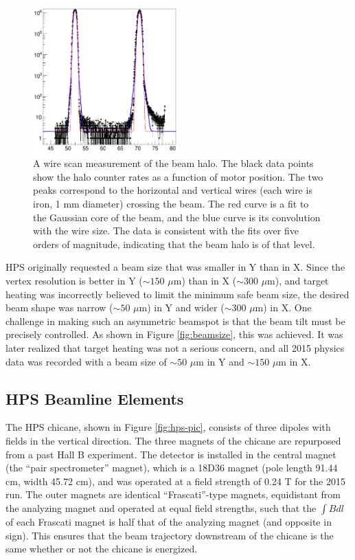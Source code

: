 \begin{figure}[htp]
    \begin{center}
        \includegraphics[width=0.5\textwidth]{detector/figs/beam-tails}
    \end{center}
    \caption{A wire scan measurement of the beam halo.
    The black data points show the halo counter rates as a function of motor position.
    The two peaks correspond to the horizontal and vertical wires (each wire is iron, 1 mm diameter) crossing the beam.
    The red curve is a fit to the Gaussian core of the beam, and the blue curve is its convolution with the wire size.
    The data is consistent with the fits over five orders of magnitude, indicating that the beam halo is of that level.
    }
    \label{fig:beam-tails}
\end{figure}

HPS originally requested a beam size that was smaller in Y than in X.
Since the vertex resolution is better in Y ($\sim 150$ $\mu$m) than in X ($\sim 300$ $\mu$m), and target heating was incorrectly believed to limit the minimum safe beam size, the desired beam shape was narrow ($\sim 50$ $\mu$m) in Y and wider ($\sim 300$ $\mu$m) in X.
One challenge in making such an asymmetric beamspot is that the beam tilt must be precisely controlled.
As shown in Figure \ref{fig:beamsize}, this was achieved.
It was later realized that target heating was not a serious concern, and all 2015 physics data was recorded with a beam size of $\sim 50$ $\mu$m in Y and $\sim 150$ $\mu$m in X.

\subsection{HPS Beamline Elements}

The HPS chicane, shown in Figure \ref{fig:hps-pic}, consists of three dipoles with fields in the vertical direction.
The three magnets of the chicane are repurposed from a past Hall B experiment.
The detector is installed in the central magnet (the ``pair spectrometer'' magnet), which is a 18D36 magnet (pole length 91.44 cm, width 45.72 cm), and was operated at a field strength of 0.24 T for the 2015 run.
The outer magnets are identical ``Frascati''-type magnets, equidistant from the analyzing magnet and operated at equal field strengths, such that the $\int B dl$ of each Frascati magnet is half that of the analyzing magnet (and opposite in sign).
This ensures that the beam trajectory downstream of the chicane is the same whether or not the chicane is energized.

